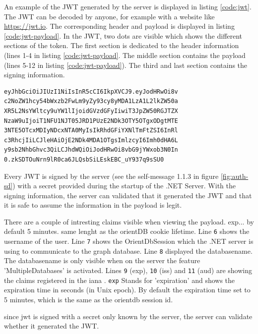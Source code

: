 An example of the JWT generated by the server is displayed in listing \ref{code:jwt}. The JWT can be decoded by anyone, for example with a website like \url{https://jwt.io}. The corresponding header and payload is displayed in listing \ref{code:jwt-payload}. In the JWT, two dots are visible which shows the different sections of the token. The first section is dedicated to the header information (lines 1-4 in listing \ref{code:jwt-payload}. The middle section contains the payload (lines 5-12 in listing \ref{code:jwt-payload}). The third and last section contains the signing information. 

\begin{lstlisting}[language=xml, caption=Example JSON Web Token (line breaks for display purposes only), style=nonrstyle, label=code:jwt]
eyJhbGciOiJIUzI1NiIsInR5cCI6IkpXVCJ9.eyJodHRwOi8v
c2NoZW1hcy54bWxzb2FwLm9yZy93cy8yMDA1LzA1L2lkZW50a
XR5L2NsYWltcy9uYW1lIjoidGVzdGFyIiwiT3JpZW50RGJTZX
NzaW9uIjoiT1NFU1NJT05JRD1PUzE2NDk3OTY5OTgxODgtMTE
3NTE5OTcxMDIyNDcxNTA0MyIsIkRhdGFiYXNlTmFtZSI6InRl
c3RhcjIiLCJleHAiOjE2NDk4MDA1OTgsImlzcyI6Imh0dHA6L
y9sb2NhbGhvc3QiLCJhdWQiOiJodHRwOi8vbG9jYWxob3N0In
0.zkSDTOuNrn9lR0ca6JLQsbSiLEskEBC_uY937q9sSU0
\end{lstlisting}

Every JWT is signed by the server (see the self-message 1.1.3 in figure \ref{fig:auth-sd}) with a secret provided during the startup of the .NET Server. With the signing information, the server can validated that it generated the JWT and that it is safe to assume the information in the payload is legit. 

There are a couple of intresting claims visible when viewing the payload. exp... by default 5 minutes. same lenght as the orientDB cookie lifetime. Line \verb|6| shows the username of the user. Line \verb|7| shows the OrientDbSession which the .NET server is using to communicate to the graph database. Line \verb|8| displayed the databasename. The databasename is only visible when on the server the feature 'MultipleDatabases' is activated. Lines \verb|9| (exp), \verb|10| (iss) and \verb|11| (aud) are showing the claims registered in the \acrfull{iana} \cite{jones2015json}. \verb|exp| Stands for 'expiration' and shows the expiration time in seconds (in Unix epoch). By default the expiration time set to 5 minutes, which is the same as the orientdb session id. 




since jwt is signed with a secret only known by the server, the server can validate whether it generated the JWT.

